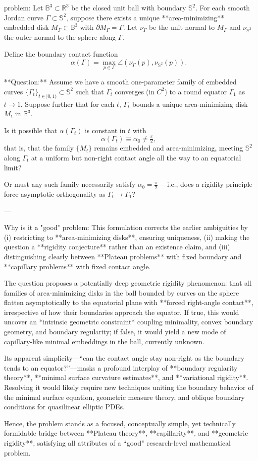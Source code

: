 problem:  
Let $\mathbb{B}^3 \subset \mathbb{R}^3$ be the closed unit ball with boundary $\mathbb{S}^2$.  
For each smooth Jordan curve $\Gamma \subset \mathbb{S}^2$, suppose there exists a unique **area-minimizing** embedded disk $M_\Gamma \subset \mathbb{B}^3$ with $\partial M_\Gamma = \Gamma$.  
Let $\nu_\Gamma$ be the unit normal to $M_\Gamma$ and $\nu_{\mathbb{S}^2}$ the outer normal to the sphere along $\Gamma$.  

Define the boundary contact function
\[
\alpha(\Gamma) = \max_{p \in \Gamma}\angle(\nu_\Gamma(p),\nu_{\mathbb{S}^2}(p)).
\]

**Question:**  
Assume we have a smooth one-parameter family of embedded curves $\{\Gamma_t\}_{t\in[0,1)} \subset \mathbb{S}^2$ such that $\Gamma_t$ converges (in $C^2$) to a round equator $\Gamma_1$ as $t\to 1$.  
Suppose further that for each $t$, $\Gamma_t$ bounds a unique area-minimizing disk $M_t$ in $\mathbb{B}^3$.  

Is it possible that $\alpha(\Gamma_t)$ is constant in $t$ with  
\[
\alpha(\Gamma_t)\equiv\alpha_0\neq \tfrac{\pi}{2},
\]
that is, that the family $\{M_t\}$ remains embedded and area-minimizing, meeting $\mathbb{S}^2$ along $\Gamma_t$ at a uniform but non-right contact angle all the way to an equatorial limit?  

Or must any such family necessarily satisfy $\alpha_0 = \tfrac{\pi}{2}$ —i.e., does a rigidity principle force asymptotic orthogonality as $\Gamma_t \to \Gamma_1$?

---

Why is it a "good" problem:  
This formulation corrects the earlier ambiguities by (i) restricting to **area-minimizing disks**, ensuring uniqueness, (ii) making the question a **rigidity conjecture** rather than an existence claim, and (iii) distinguishing clearly between **Plateau problems** with fixed boundary and **capillary problems** with fixed contact angle.  

The question proposes a potentially deep geometric rigidity phenomenon: that all families of area-minimizing disks in the ball bounded by curves on the sphere flatten asymptotically to the equatorial plane with **forced right-angle contact**, irrespective of how their boundaries approach the equator.  
If true, this would uncover an *intrinsic geometric constraint* coupling minimality, convex boundary geometry, and boundary regularity; if false, it would yield a new mode of capillary-like minimal embeddings in the ball, currently unknown.  

Its apparent simplicity—“can the contact angle stay non-right as the boundary tends to an equator?”—masks a profound interplay of **boundary regularity theory**, **minimal surface curvature estimates**, and **variational rigidity**.  
Resolving it would likely require new techniques uniting the boundary behavior of the minimal surface equation, geometric measure theory, and oblique boundary conditions for quasilinear elliptic PDEs.  

Hence, the problem stands as a focused, conceptually simple, yet technically formidable bridge between **Plateau theory**, **capillarity**, and **geometric rigidity**, satisfying all attributes of a “good” research-level mathematical problem.